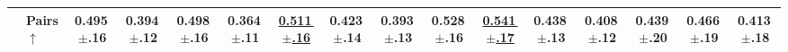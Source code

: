 \begin{table}[t]
\begin{tabular}{@{}cl *{14}{c}@{}}
 & Pairs $\uparrow$ & 0.495\,{\tiny$\pm$.16} & 0.394\,{\tiny$\pm$.12} & 0.498\,{\tiny$\pm$.16} & 0.364\,{\tiny$\pm$.11} & \underline{0.511\,{\tiny$\pm$.16}} & 0.423\,{\tiny$\pm$.14} & 0.393\,{\tiny$\pm$.13} & \textbf{0.528\,{\tiny$\pm$.16}} & \textbf{\underline{0.541\,{\tiny$\pm$.17}}} & 0.438\,{\tiny$\pm$.13} & 0.408\,{\tiny$\pm$.12} & 0.439\,{\tiny$\pm$.20} & 0.466\,{\tiny$\pm$.19} & 0.413\,{\tiny$\pm$.18} \\
\bottomrule
\end{tabular}
\end{table}
